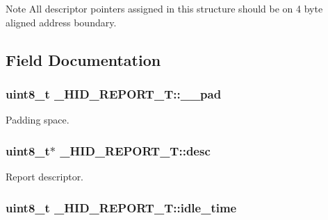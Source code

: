\begin{DoxyNote}{Note}
All descriptor pointers assigned in this structure should be on 4 byte aligned address boundary. 
\end{DoxyNote}


\subsection{Field Documentation}
\hypertarget{struct__HID__REPORT__T_a9d56a95a8b9dbdc3bfaec651d23bd360}{
\subsubsection[{\-\_\-\-\_\-pad}]{\setlength{\rightskip}{0pt plus 5cm}uint8\-\_\-t \-\_\-\-H\-I\-D\-\_\-\-R\-E\-P\-O\-R\-T\-\_\-\-T\-::\-\_\-\-\_\-pad}}\label{struct__HID__REPORT__T_a9d56a95a8b9dbdc3bfaec651d23bd360}
Padding space. \hypertarget{struct__HID__REPORT__T_a312421c8506e4dcd1ba2d40a9c409211}{
\subsubsection[{desc}]{\setlength{\rightskip}{0pt plus 5cm}uint8\-\_\-t$\ast$ \-\_\-\-H\-I\-D\-\_\-\-R\-E\-P\-O\-R\-T\-\_\-\-T\-::desc}}\label{struct__HID__REPORT__T_a312421c8506e4dcd1ba2d40a9c409211}
Report descriptor. \hypertarget{struct__HID__REPORT__T_a388e7eacbfc2006e0ada9e81da54760b}{
\subsubsection[{idle\-\_\-time}]{\setlength{\rightskip}{0pt plus 5cm}uint8\-\_\-t \-\_\-\-H\-I\-D\-\_\-\-R\-E\-P\-O\-R\-T\-\_\-\-T\-::idle\-\_\-time}}\label{struct__HID__REPORT__T_a388e7eacbfc2006e0ada9e81da54760b}
